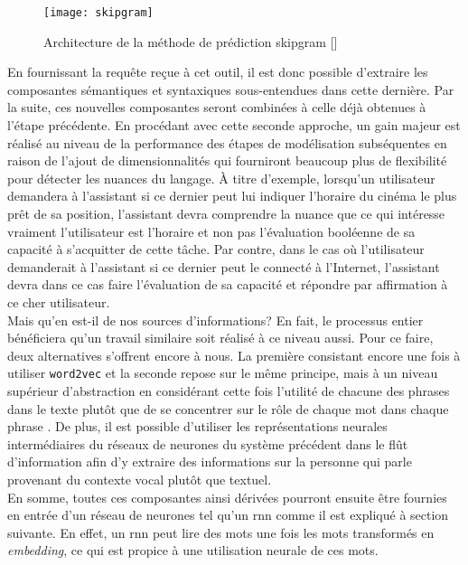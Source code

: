 \begin{figure}[ht]
  \centering
  \texttt{[image: skipgram]}
  \caption{Architecture de la méthode de prédiction \gls{skipgram} []}
  \label{fig:skipgram}
\end{figure}

En fournissant la requête reçue à cet outil, il est donc possible d'extraire les composantes sémantiques et syntaxiques sous-entendues dans cette dernière. Par la suite, ces nouvelles composantes seront combinées à celle déjà obtenues à l'étape précédente. En procédant avec cette seconde approche, un gain majeur est réalisé au niveau de la performance des étapes de modélisation subséquentes en raison de l'ajout de dimensionnalités qui fourniront beaucoup plus de flexibilité pour détecter les nuances du langage. À titre d'exemple, lorsqu'un utilisateur demandera à l'assistant si ce dernier peut lui indiquer l'horaire du cinéma le plus prêt de sa position, l'assistant devra comprendre la nuance que ce qui intéresse vraiment l'utilisateur est l'horaire et non pas l'évaluation booléenne de sa capacité à s'acquitter de cette tâche. Par contre, dans le cas où l'utilisateur demanderait à l'assistant si ce dernier peut le connecté à l'Internet, l'assistant devra dans ce cas faire l'évaluation de sa capacité et répondre par affirmation à ce cher utilisateur. \\

Mais qu'en est-il de nos sources d'informations? En fait, le processus entier bénéficiera qu'un travail similaire soit réalisé à ce niveau aussi. Pour ce faire, deux alternatives s'offrent encore à nous. La première consistant encore une fois à utiliser \texttt{word2vec} et la seconde repose sur le même principe, mais à un niveau supérieur d'abstraction en considérant cette fois l'utilité de chacune des phrases dans le texte plutôt que de se concentrer sur le rôle de chaque mot dans chaque phrase \cite{inferSent}. De plus, il est possible d'utiliser les représentations neurales intermédiaires du réseaux de neurones du système précédent dans le flût d'information afin d'y extraire des informations sur la personne qui parle provenant du contexte vocal plutôt que textuel. \\

En somme, toutes ces composantes ainsi dérivées pourront ensuite être fournies en entrée d'un réseau de neurones tel qu'un \gls{rnn} comme il est expliqué à section suivante. En effet, un \gls{rnn} peut lire des mots une fois les mots transformés en \textit{embedding}, ce qui est propice à une utilisation neurale de ces mots.
